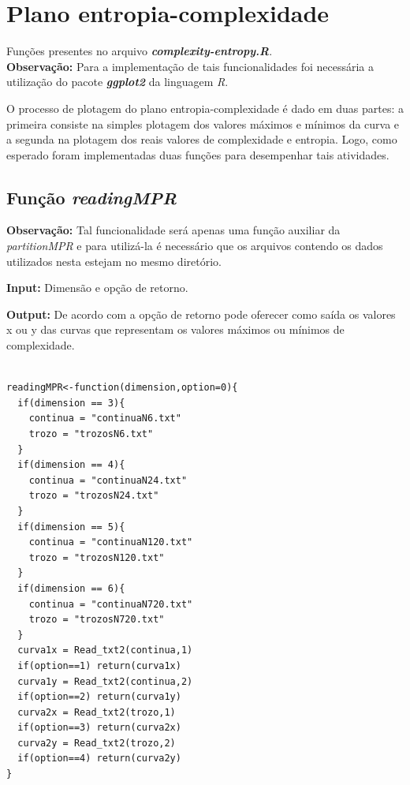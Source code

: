 \documentclass[12pt,letterpaper]{article}
\begin{document}
\section{Plano entropia-complexidade}

Funções presentes no arquivo \textbf{\textit{complexity-entropy.R}}.\\

\textbf{Observação:} Para a implementação de tais funcionalidades foi necessária a utilização do pacote \textit{\textbf{ggplot2}} da linguagem \textit{R}.

O processo de plotagem do plano entropia-complexidade é dado em duas partes: a primeira consiste na simples plotagem dos valores máximos e mínimos da curva e a segunda na plotagem dos reais valores de complexidade e entropia. Logo, como esperado foram implementadas duas funções para 
desempenhar tais atividades.

\subsection{Função \textit{readingMPR}}

\textbf{Observação: } Tal funcionalidade será apenas uma função auxiliar da \textit{partitionMPR}  e para utilizá-la é necessário que os arquivos contendo os dados utilizados nesta estejam no mesmo diretório.

\textbf{Input: } Dimensão e opção de retorno.

\textbf{Output: } De acordo com a opção de retorno pode oferecer como saída os valores x ou y das curvas que representam os valores máximos ou mínimos de complexidade.

\begin{lstlisting}

readingMPR<-function(dimension,option=0){
  if(dimension == 3){ 
    continua = "continuaN6.txt"
    trozo = "trozosN6.txt"
  }
  if(dimension == 4){ 
    continua = "continuaN24.txt"
    trozo = "trozosN24.txt"
  }
  if(dimension == 5){ 
    continua = "continuaN120.txt"
    trozo = "trozosN120.txt"
  }
  if(dimension == 6){ 
    continua = "continuaN720.txt"
    trozo = "trozosN720.txt"
  }
  curva1x = Read_txt2(continua,1) 
  if(option==1) return(curva1x)
  curva1y = Read_txt2(continua,2)
  if(option==2) return(curva1y)
  curva2x = Read_txt2(trozo,1)
  if(option==3) return(curva2x)
  curva2y = Read_txt2(trozo,2)
  if(option==4) return(curva2y)
}

\end{lstlisting}
\end{document}
